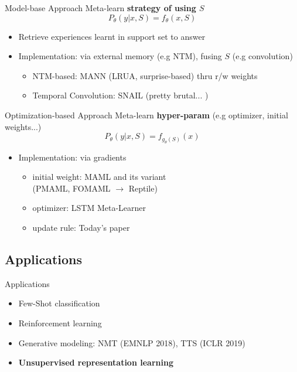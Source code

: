 \documentclass{beamer}
\begin{document}
\begin{frame}{Model-base Approach}
  Meta-learn \textbf{strategy of using $S$}
  \[ P_\theta(y|x,S) = f_\theta(x,S) \]
  \begin{itemize}
    \item Retrieve experiences learnt in support set to answer
    \item Implementation: via external memory (e.g NTM), fusing $S$ (e.g convolution)
    \begin{itemize}
      \item NTM-based: MANN (LRUA, surprise-based) thru r/w weights
      \item Temporal Convolution: SNAIL (pretty brutal... )
    \end{itemize}
\end{itemize}
\end{frame}

\begin{frame}{Optimization-based Approach}
  Meta-learn \textbf{hyper-param} (e.g optimizer, initial weights...)
  \[ P_\theta(y|x,S) = f_{g_\theta(S)}(x) \]
  \begin{itemize}
    \item Implementation: via gradients 
      \begin{itemize}
        \item initial weight: MAML and its variant\\
          (PMAML, FOMAML $\rightarrow$ Reptile)
        \item optimizer: LSTM Meta-Learner
        \item update rule: Today's paper
      \end{itemize}
  \end{itemize}
\end{frame}

\subsection{Applications}

\begin{frame}{Applications}
  \begin{itemize}
    \item Few-Shot classification
    \item Reinforcement learning
    \item Generative modeling: NMT (EMNLP 2018), TTS (ICLR 2019)
    \item \textbf{Unsupervised representation learning}
  \end{itemize}
\end{frame}
\end{document}
